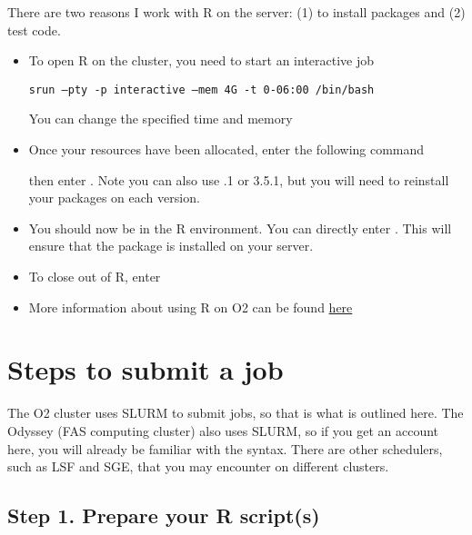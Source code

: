 \documentclass[11pt, oneside]{article}   	%
\begin{document}
There are two reasons I work with R on the server: (1) to install packages and (2) test code. 

\begin{itemize}
	\item To open R on the cluster, you need to start an interactive job
	
	\begin{center}
	 \tt{srun --pty -p interactive --mem 4G -t 0-06:00 /bin/bash}
	\end{center}
	
	You can change the specified time and memory
	
	\item Once your resources have been allocated, enter the following command
	
	\begin{center}
	\end{center}

then enter  \normalfont. Note you can also use  .1 or 3.5.1, but you will need to reinstall your packages on each version. 
	
	\item You should now be in the R environment. You can directly enter  \normalfont. This will ensure that the package is installed on your server. 
	
	\item To close out of R, enter  \normalfont 
	\item More information about using R on O2 can be found \href{https://wiki.rc.hms.harvard.edu/display/O2/Personal+R+Packages}{here}
\end{itemize}
	
\section{Steps to submit a job}

The O2 cluster uses SLURM to submit jobs, so that is what is outlined here. The Odyssey (FAS computing cluster) also uses SLURM, so if you get an account here, you will already be familiar with the syntax. There are other schedulers, such as LSF and SGE, that you may encounter on different clusters. 

\subsection*{Step 1. Prepare your R script(s)} 
\end{document}
